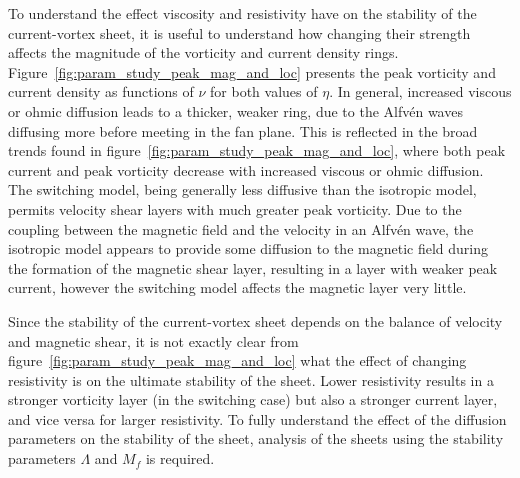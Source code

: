 To understand the effect viscosity and resistivity have on the stability of the current-vortex sheet, it is useful to understand how changing their strength affects the magnitude of the vorticity and current density rings. Figure~\ref{fig:param_study_peak_mag_and_loc} presents the peak vorticity and current density as functions of $\nu$ for both values of $\eta$. In general, increased viscous or ohmic diffusion leads to a thicker, weaker ring, due to the Alfv\'en waves diffusing more before meeting in the fan plane. This is reflected in the broad trends found in figure~\ref{fig:param_study_peak_mag_and_loc}, where both peak current and peak vorticity decrease with increased viscous or ohmic diffusion. The switching model, being generally less diffusive than the isotropic model, permits velocity shear layers with much greater peak vorticity. Due to the coupling between the magnetic field and the velocity in an Alfv\'en wave, the isotropic model appears to provide some diffusion to the magnetic field during the formation of the magnetic shear layer, resulting in a layer with weaker peak current, however the switching model affects the magnetic layer very little.

Since the stability of the current-vortex sheet depends on the balance of velocity and magnetic shear, it is not exactly clear from figure~\ref{fig:param_study_peak_mag_and_loc} what the effect of changing resistivity is on the ultimate stability of the sheet. Lower resistivity results in a stronger vorticity layer (in the switching case) but also a stronger current layer, and vice versa for larger resistivity. To fully understand the effect of the diffusion parameters on the stability of the sheet, analysis of the sheets using the stability parameters $\Lambda$ and $M_f$ is required.


